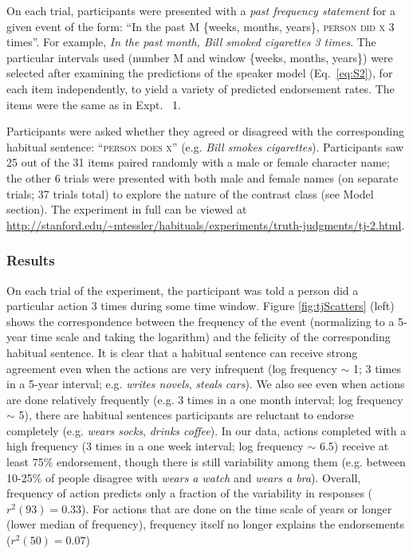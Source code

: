 \documentclass[11pt,letterpaper]{article}
\begin{document}
On each trial, participants were presented with a \emph{past frequency statement} for a given event of the form: ``In the past M \{weeks, months, years\}, \textsc{person} \textsc{did x} 3 times''.
For example, \emph{In the past month, Bill smoked cigarettes 3 times}.
The particular intervals used (number M and window \{weeks, months, years\}) were selected after examining the predictions of the speaker model (Eq.~\ref{eq:S2}), for each item independently, to yield a variety of predicted endorsement rates.
The items were the same as in Expt. ~1.

Participants were asked whether they agreed or disagreed with the corresponding habitual sentence: ``\textsc{person does x}'' (e.g. \emph{Bill smokes cigarettes}).
Participants saw 25 out of the 31 items paired randomly with a male or female character name; the other 6 trials were presented with both male and female names (on separate trials; 37 trials total) to explore the nature of the contrast class (see Model section). 
The experiment in full can be viewed at \url{http://stanford.edu/~mtessler/habituals/experiments/truth-judgments/tj-2.html}.

\subsubsection*{Results}
On each trial of the experiment, the participant was told a person did a particular action 3 times during some time window. 
Figure \ref{fig:tjScatters} (left) shows the correspondence between the frequency of the event (normalizing to a 5-year time scale and taking the logarithm) and the felicity of the corresponding habitual sentence. 
It is clear that a habitual sentence can receive strong agreement even when the actions are very infrequent (log frequency $\sim$ 1; 3 times in a 5-year interval; e.g. \emph{writes novels}, \emph{steals cars}).
We also see even when actions are done relatively frequently (e.g. 3 times in a one month interval; log frequency $\sim$ 5), there are habitual sentences participants are reluctant to endorse completely (e.g. \emph{wears socks}, \emph{drinks coffee}). 
In our data, actions completed with a high frequency (3 times in a one week interval; log frequency $\sim$ 6.5) receive at least 75\% endorsement, though there is still variability among them (e.g. between 10-25\% of people disagree with \emph{wears a watch} and \emph{wears a bra}). %
Overall, frequency of action predicts only a fraction of the variability in responses ($r^2(93) = 0.33$).
For actions that are done on the time scale of years or longer (lower median of frequency), frequency itself no longer explains the endorsements ($r^2(50) = 0.07$)
\end{document}
